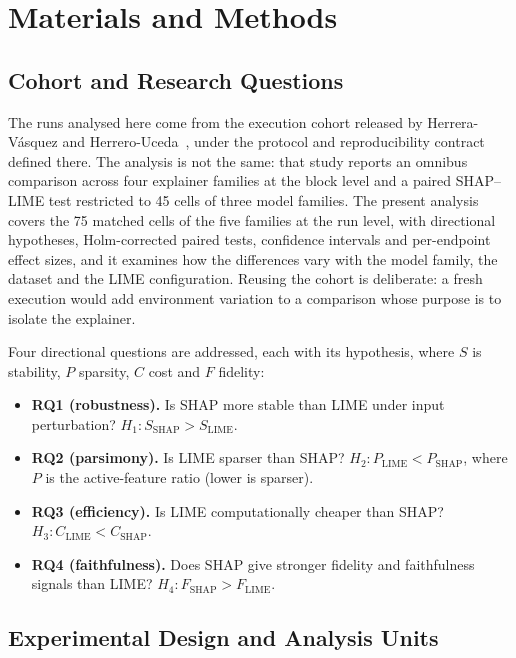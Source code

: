 \documentclass{cleiej}
\begin{document}
\section{Materials and Methods}
\label{sec:methods}

\subsection{Cohort and Research Questions}
\label{sec:rqs}

The runs analysed here come from the execution cohort released by
Herrera-V\'asquez and Herrero-Uceda~\cite{herrera2026framework}, under the
protocol and reproducibility contract defined there. The analysis is not
the same: that study reports an omnibus comparison across four explainer
families at the block level and a paired SHAP--LIME test restricted to 45
cells of three model families. The present analysis covers the 75 matched
cells of the five families at the run level, with directional hypotheses,
Holm-corrected paired tests, confidence intervals and per-endpoint effect
sizes, and it examines how the differences vary with the model family, the
dataset and the LIME configuration. Reusing the cohort is deliberate: a fresh
execution would add environment variation to a comparison whose purpose is
to isolate the explainer.

Four directional questions are addressed, each with its hypothesis, where
$S$ is stability, $P$ sparsity, $C$ cost and $F$ fidelity:
\begin{itemize}
\item \textbf{RQ1 (robustness).} Is SHAP more stable than LIME under input
perturbation? $H_1: S_{\mathrm{SHAP}} > S_{\mathrm{LIME}}$.
\item \textbf{RQ2 (parsimony).} Is LIME sparser than SHAP?
$H_2: P_{\mathrm{LIME}} < P_{\mathrm{SHAP}}$, where $P$ is the
active-feature ratio (lower is sparser).
\item \textbf{RQ3 (efficiency).} Is LIME computationally cheaper than SHAP?
$H_3: C_{\mathrm{LIME}} < C_{\mathrm{SHAP}}$.
\item \textbf{RQ4 (faithfulness).} Does SHAP give stronger fidelity and
faithfulness signals than LIME? $H_4: F_{\mathrm{SHAP}} > F_{\mathrm{LIME}}$.
\end{itemize}

\subsection{Experimental Design and Analysis Units}
\label{sec:design}
\end{document}
